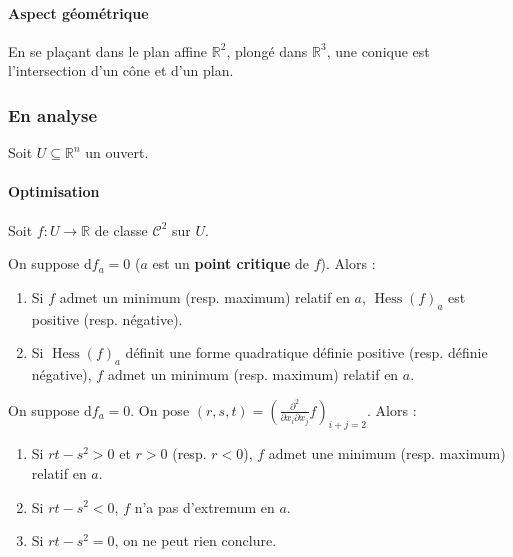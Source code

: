  \paragraph{Aspect géométrique}


  \begin{proposition}
    En se plaçant dans le plan affine $\mathbb{R}^2$, plongé dans $\mathbb{R}^3$, une conique est l'intersection d'un cône et d'un plan.
  \end{proposition}

  \subsubsection{En analyse}

  Soit $U \subseteq \mathbb{R}^n$ un ouvert.

  \paragraph{Optimisation}

  Soit $f : U \rightarrow \mathbb{R}$ de classe $\mathcal{C}^2$ sur $U$.


  \begin{theorem}
    On suppose $\mathrm{d}f_a = 0$ ($a$ est un \textbf{point critique} de $f$). Alors :
    \begin{enumerate}[label={\bfseries(\roman*)}]
      \item Si $f$ admet un minimum (resp. maximum) relatif en $a$, $\operatorname{Hess}(f)_a$ est positive (resp. négative).
      \item Si $\operatorname{Hess}(f)_a$ définit une forme quadratique définie positive (resp. définie négative), $f$ admet un minimum (resp. maximum) relatif en $a$.
    \end{enumerate}
  \end{theorem}

  \begin{example}
    On suppose $\mathrm{d}f_a = 0$. On pose $(r,s,t) = \left(  \frac{\partial^2}{\partial x_i \partial x_j} f \right)_{i+j=2}$. Alors :
    \begin{enumerate}[label={\bfseries(\roman*)}]
      \item Si $rt-s^2 > 0$ et $r > 0$ (resp. $r < 0$), $f$ admet une minimum (resp. maximum) relatif en $a$.
      \item Si $rt-s^2 < 0$, $f$ n'a pas d'extremum en $a$.
      \item Si $rt-s^2 = 0$, on ne peut rien conclure.
    \end{enumerate}
  \end{example}

